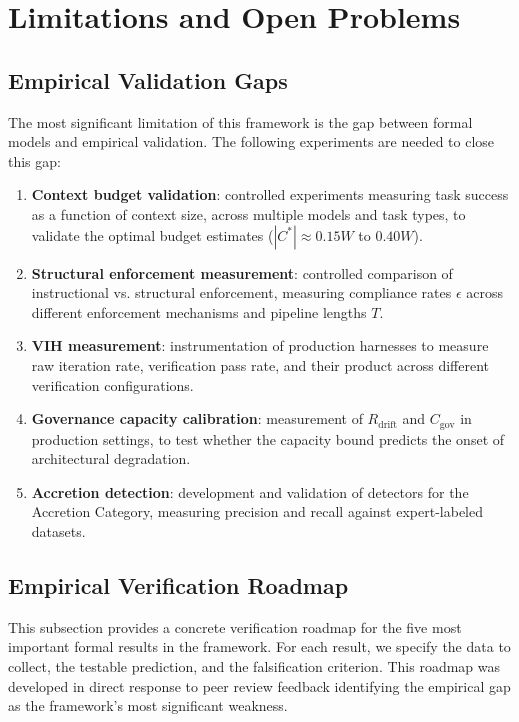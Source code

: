\documentclass[11pt, a4paper, logo, copyright]{googledeepmind}
\begin{document}
\section{Limitations and Open Problems}
\label{sec:limitations}

\subsection{Empirical Validation Gaps}

The most significant limitation of this framework is the gap between formal models and empirical validation. The following experiments are needed to close this gap:

\begin{enumerate}
    \item \textbf{Context budget validation}: controlled experiments measuring task success as a function of context size, across multiple models and task types, to validate the optimal budget estimates ($|C^*| \approx 0.15W$ to $0.40W$).
    \item \textbf{Structural enforcement measurement}: controlled comparison of instructional vs. structural enforcement, measuring compliance rates $\epsilon$ across different enforcement mechanisms and pipeline lengths $T$.
    \item \textbf{VIH measurement}: instrumentation of production harnesses to measure raw iteration rate, verification pass rate, and their product across different verification configurations.
    \item \textbf{Governance capacity calibration}: measurement of $R_{\text{drift}}$ and $C_{\text{gov}}$ in production settings, to test whether the capacity bound predicts the onset of architectural degradation.
    \item \textbf{Accretion detection}: development and validation of detectors for the Accretion Category, measuring precision and recall against expert-labeled datasets.
\end{enumerate}

\subsection{Empirical Verification Roadmap}
\label{sec:verification-roadmap}

This subsection provides a concrete verification roadmap for the five most important formal results in the framework. For each result, we specify the data to collect, the testable prediction, and the falsification criterion. This roadmap was developed in direct response to peer review feedback identifying the empirical gap as the framework's most significant weakness.
\end{document}
